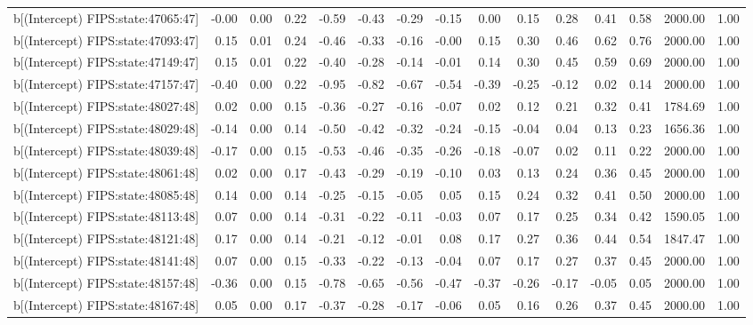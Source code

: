 \begin{table}[ht]
\begin{tabular}{rrrrrrrrrrrrrrr}
  b[(Intercept) FIPS:state:47065:47] & -0.00 & 0.00 & 0.22 & -0.59 & -0.43 & -0.29 & -0.15 & 0.00 & 0.15 & 0.28 & 0.41 & 0.58 & 2000.00 & 1.00 \\ 
  b[(Intercept) FIPS:state:47093:47] & 0.15 & 0.01 & 0.24 & -0.46 & -0.33 & -0.16 & -0.00 & 0.15 & 0.30 & 0.46 & 0.62 & 0.76 & 2000.00 & 1.00 \\ 
  b[(Intercept) FIPS:state:47149:47] & 0.15 & 0.01 & 0.22 & -0.40 & -0.28 & -0.14 & -0.01 & 0.14 & 0.30 & 0.45 & 0.59 & 0.69 & 2000.00 & 1.00 \\ 
  b[(Intercept) FIPS:state:47157:47] & -0.40 & 0.00 & 0.22 & -0.95 & -0.82 & -0.67 & -0.54 & -0.39 & -0.25 & -0.12 & 0.02 & 0.14 & 2000.00 & 1.00 \\ 
  b[(Intercept) FIPS:state:48027:48] & 0.02 & 0.00 & 0.15 & -0.36 & -0.27 & -0.16 & -0.07 & 0.02 & 0.12 & 0.21 & 0.32 & 0.41 & 1784.69 & 1.00 \\ 
  b[(Intercept) FIPS:state:48029:48] & -0.14 & 0.00 & 0.14 & -0.50 & -0.42 & -0.32 & -0.24 & -0.15 & -0.04 & 0.04 & 0.13 & 0.23 & 1656.36 & 1.00 \\ 
  b[(Intercept) FIPS:state:48039:48] & -0.17 & 0.00 & 0.15 & -0.53 & -0.46 & -0.35 & -0.26 & -0.18 & -0.07 & 0.02 & 0.11 & 0.22 & 2000.00 & 1.00 \\ 
  b[(Intercept) FIPS:state:48061:48] & 0.02 & 0.00 & 0.17 & -0.43 & -0.29 & -0.19 & -0.10 & 0.03 & 0.13 & 0.24 & 0.36 & 0.45 & 2000.00 & 1.00 \\ 
  b[(Intercept) FIPS:state:48085:48] & 0.14 & 0.00 & 0.14 & -0.25 & -0.15 & -0.05 & 0.05 & 0.15 & 0.24 & 0.32 & 0.41 & 0.50 & 2000.00 & 1.00 \\ 
  b[(Intercept) FIPS:state:48113:48] & 0.07 & 0.00 & 0.14 & -0.31 & -0.22 & -0.11 & -0.03 & 0.07 & 0.17 & 0.25 & 0.34 & 0.42 & 1590.05 & 1.00 \\ 
  b[(Intercept) FIPS:state:48121:48] & 0.17 & 0.00 & 0.14 & -0.21 & -0.12 & -0.01 & 0.08 & 0.17 & 0.27 & 0.36 & 0.44 & 0.54 & 1847.47 & 1.00 \\ 
  b[(Intercept) FIPS:state:48141:48] & 0.07 & 0.00 & 0.15 & -0.33 & -0.22 & -0.13 & -0.04 & 0.07 & 0.17 & 0.27 & 0.37 & 0.45 & 2000.00 & 1.00 \\ 
  b[(Intercept) FIPS:state:48157:48] & -0.36 & 0.00 & 0.15 & -0.78 & -0.65 & -0.56 & -0.47 & -0.37 & -0.26 & -0.17 & -0.05 & 0.05 & 2000.00 & 1.00 \\ 
  b[(Intercept) FIPS:state:48167:48] & 0.05 & 0.00 & 0.17 & -0.37 & -0.28 & -0.17 & -0.06 & 0.05 & 0.16 & 0.26 & 0.37 & 0.45 & 2000.00 & 1.00 \\ 

\end{tabular}
\end{table}

